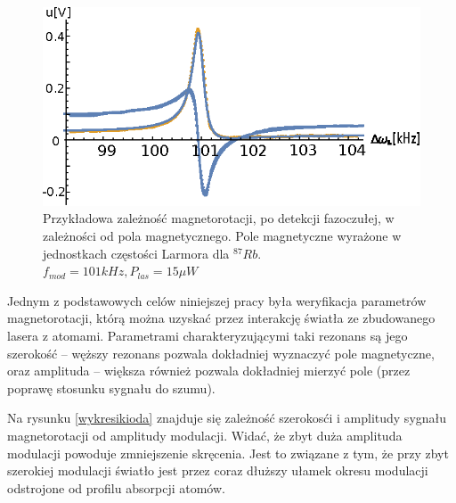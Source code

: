 \documentclass[a4paper,10pt]{article}
\begin{document}
\begin{figure}[h!]
\centering
 \includegraphics[width=\textwidth]{magnetorot1.eps}
 \caption{Przykładowa zależność magnetorotacji, po detekcji fazoczułej, w zależności od pola magnetycznego. Pole magnetyczne wyrażone w jednostkach częstości Larmora dla ${}^{87} Rb$.
 $f_{mod}=101kHz, P_{las}=15 \mu W$}
 \label{fig:magnetorot1}
\end{figure}

Jednym z podstawowych celów niniejszej pracy była weryfikacja parametrów magnetorotacji, którą można uzyskać przez interakcję światła ze zbudowanego lasera z atomami.
Parametrami charakteryzującymi taki rezonans są jego  szerokość -- węższy rezonans pozwala dokładniej wyznaczyć pole magnetyczne, oraz amplituda -- większa również pozwala dokładniej mierzyć pole (przez poprawę stosunku sygnału do szumu).

Na rysunku \ref{wykresikioda} znajduje się zależność szerokosći i amplitudy sygnału magnetorotacji od amplitudy modulacji. Widać, że zbyt duża amplituda modulacji powoduje zmniejszenie skręcenia. Jest to związane z tym, że przy zbyt szerokiej modulacji światło jest przez coraz dłuższy ułamek okresu modulacji odstrojone od profilu absorpcji atomów. 
\end{document}
